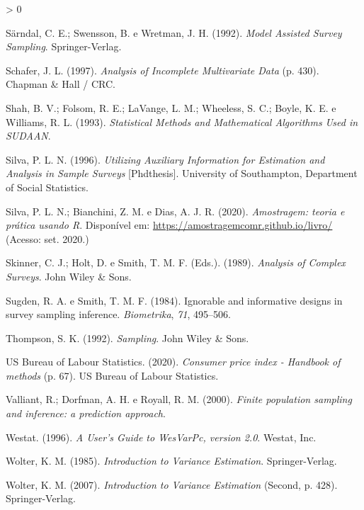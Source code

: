 \documentclass[
  12pt,
  brazilian,
]{book}
\newlength{\cslhangindent}
\newenvironment{CSLReferences}[2] %
 {%
  \setlength{\parindent}{0pt}
  \ifodd #1 \everypar{\setlength{\hangindent}{\cslhangindent}}\ignorespaces\fi
  \ifnum #2 > 0
  \setlength{\parskip}{#2\baselineskip}
  \fi
 }%
 {}
\theoremstyle{definition}
\theoremstyle{definition}
\theoremstyle{definition}
\theoremstyle{definition}
\theoremstyle{remark}
\begin{document}
\begin{CSLReferences}{1}{0}
\leavevmode\hypertarget{ref-SSW1992}{}%
Särndal, C. E.; Swensson, B. e Wretman, J. H. (1992). \emph{Model Assisted Survey Sampling}. Springer-Verlag.

\leavevmode\hypertarget{ref-Schafer1997}{}%
Schafer, J. L. (1997). \emph{{Analysis of Incomplete Multivariate Data}} (p. 430). Chapman {\&} Hall / CRC.

\leavevmode\hypertarget{ref-Shah1993}{}%
Shah, B. V.; Folsom, R. E.; LaVange, L. M.; Wheeless, S. C.; Boyle, K. E. e Williams, R. L. (1993). \emph{Statistical Methods and Mathematical Algorithms Used in SUDAAN}.

\leavevmode\hypertarget{ref-Silva1996}{}%
Silva, P. L. N. (1996). \emph{Utilizing Auxiliary Information for Estimation and Analysis in Sample Surveys} {[}Phdthesis{]}. University of Southampton, Department of Social Statistics.

\leavevmode\hypertarget{ref-Silva2020}{}%
Silva, P. L. N.; Bianchini, Z. M. e Dias, A. J. R. (2020). \emph{{Amostragem: teoria e pr{á}tica usando R}}. Disponível em: \url{https://amostragemcomr.github.io/livro/} (Acesso: set. 2020.)

\leavevmode\hypertarget{ref-SHS89}{}%
Skinner, C. J.; Holt, D. e Smith, T. M. F. (Eds.). (1989). \emph{Analysis of Complex Surveys}. John Wiley \& Sons.

\leavevmode\hypertarget{ref-Sugden84}{}%
Sugden, R. A. e Smith, T. M. F. (1984). Ignorable and informative designs in survey sampling inference. \emph{Biometrika}, \emph{71}, 495--506.

\leavevmode\hypertarget{ref-thompson1992}{}%
Thompson, S. K. (1992). \emph{Sampling}. John Wiley \& Sons.

\leavevmode\hypertarget{ref-USBLS2020}{}%
US Bureau of Labour Statistics. (2020). \emph{{Consumer price index - Handbook of methods}} (p. 67). US Bureau of Labour Statistics.

\leavevmode\hypertarget{ref-valliant2000}{}%
Valliant, R.; Dorfman, A. H. e Royall, R. M. (2000). \emph{Finite population sampling and inference: a prediction approach}.

\leavevmode\hypertarget{ref-Westat1996}{}%
Westat. (1996). \emph{A User's Guide to {WesVarPc}, version 2.0}. Westat, Inc.

\leavevmode\hypertarget{ref-Wolter1985}{}%
Wolter, K. M. (1985). \emph{Introduction to Variance Estimation}. Springer-Verlag.

\leavevmode\hypertarget{ref-Wolter2007}{}%
Wolter, K. M. (2007). \emph{Introduction to Variance Estimation} (Second, p. 428). Springer-Verlag.

\end{CSLReferences}
\end{document}
